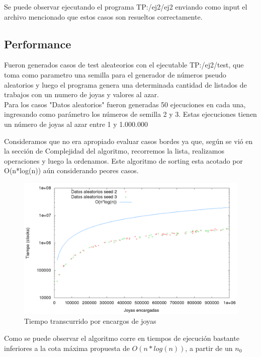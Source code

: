 Se puede observar ejecutando el programa TP:/ej2/ej2 enviando como input el archivo mencionado que estos casos son resueltos correctamente.

\subsection{Performance}

Fueron generados casos de test aleateorios con el ejecutable TP:/ej2/test, que toma como parametro una semilla para el generador de n\'umeros pseudo aleatorios y luego el programa genera una determinada cantidad de listados de trabajos con un numero de joyas y valores al azar.\\

Para los casos "Datos aleatorios" fueron generadas 50 ejecuciones en cada una, ingresando como par\'ametro los n\'umeros de semilla 2 y 3. Estas ejecuciones tienen un n\'umero de joyas al azar entre 1 y 1.000.000

Consideramos que no era apropiado evaluar casos bordes ya que, seg\'un se vi\'o en la secci\'on de Complejidad del algoritmo, recorremos la lista, realizamos operaciones y luego la ordenamos. Este algoritmo de sorting esta acotado por O(n*log(n)) a\'un considerando peores casos.

\begin{center}
\begin{figure}[h!]
\includegraphics[scale=0.4]{./img/ej2_chart2.png}
\caption{Tiempo transcurrido por encargos de joyas}
\end{figure}
\end{center}

Como se puede observar el algoritmo corre en tiempos de ejecuci\'on bastante inferiores a la cota m\'axima propuesta de $O(n*log(n))$, a partir de un $n_{0}$
